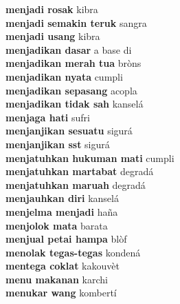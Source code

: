\textbf{ menjadi rosak  } kibra \\
\textbf{ menjadi semakin teruk  } sangra \\
\textbf{ menjadi usang  } kibra \\
\textbf{ menjadikan dasar  } a base di \\
\textbf{ menjadikan merah tua  } bròns \\
\textbf{ menjadikan nyata  } cumpli \\
\textbf{ menjadikan sepasang  } acopla \\
\textbf{ menjadikan tidak sah  } kanselá \\
\textbf{ menjaga hati  } sufri \\
\textbf{ menjanjikan sesuatu  } sigurá \\
\textbf{ menjanjikan sst  } sigurá \\
\textbf{ menjatuhkan hukuman mati  } cumpli \\
\textbf{ menjatuhkan martabat  } degradá \\
\textbf{ menjatuhkan maruah  } degradá \\
\textbf{ menjauhkan diri  } kanselá \\
\textbf{ menjelma menjadi  } haña \\
\textbf{ menjolok mata  } barata \\
\textbf{ menjual petai hampa  } blòf \\
\textbf{ menolak tegas-tegas  } kondená \\
\textbf{ mentega coklat  } kakouvèt \\
\textbf{ menu makanan  } karchi \\
\textbf{ menukar wang  } kombertí \\
